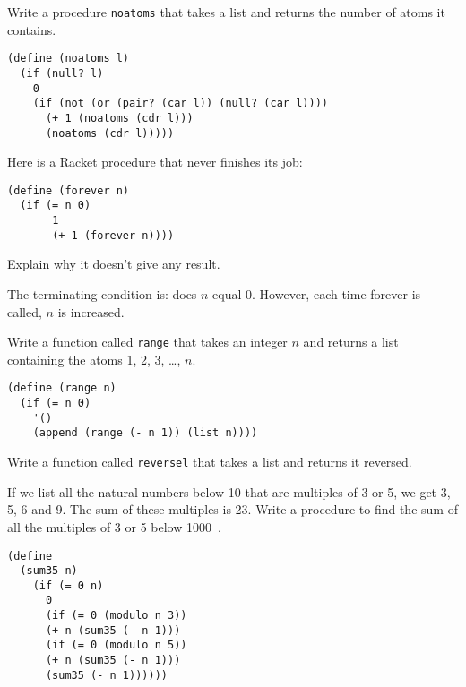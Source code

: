 \begin{questions}
\question
Write a procedure \texttt{noatoms} that takes a list and returns the number of atoms it contains.

\begin{solution}
  \begin{verbatim}
(define (noatoms l)
  (if (null? l)
    0
    (if (not (or (pair? (car l)) (null? (car l))))
      (+ 1 (noatoms (cdr l)))
      (noatoms (cdr l)))))
  \end{verbatim}
\end{solution}

\question
Here is a Racket procedure that never finishes its job:
\begin{verbatim}
(define (forever n)
  (if (= n 0)
       1
       (+ 1 (forever n))))
\end{verbatim}
Explain why it doesn’t give any result\cite{simplyscheme}.

\begin{solution}
The terminating condition is: does $n$ equal 0.
However, each time forever is called, $n$ is increased.
\end{solution}

\question
Write a function called \texttt{range} that takes an integer $n$ and returns a list containing the atoms 1, 2, 3, \ldots, $n$.

\begin{solution}
\begin{verbatim}
(define (range n)
  (if (= n 0)
    '()
    (append (range (- n 1)) (list n))))
\end{verbatim}
\end{solution}

\question
Write a function called \texttt{reversel} that takes a list and returns it reversed.  

\question
If we list all the natural numbers below 10 that are multiples of 3 or 5, we get 3, 5, 6 and 9.
The sum of these multiples is 23.
Write a procedure to find the sum of all the multiples of 3 or 5 below 1000~\cite{projecteuler}.

\begin{solution}
  \begin{verbatim}
(define 
  (sum35 n)
    (if (= 0 n)
      0
      (if (= 0 (modulo n 3))
      (+ n (sum35 (- n 1)))
      (if (= 0 (modulo n 5))
      (+ n (sum35 (- n 1)))
      (sum35 (- n 1))))))
  \end{verbatim}
\end{solution}


\end{questions}
